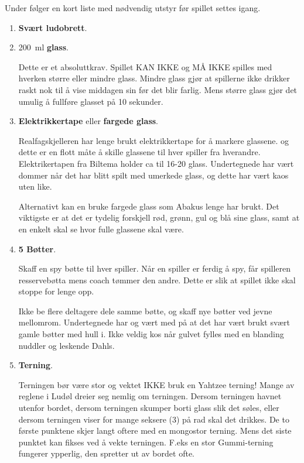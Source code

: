 \documentclass[10pt,a4paper,norsk,openany]{book}
\begin{document}
Under følger en kort liste med nødvendig utstyr før spillet settes igang.

\begin{enumerate}

  \item \textbf{Svært ludobrett}.

  \item \SI{200}{\ml} \textbf{glass}.

    Dette er et absoluttkrav. Spillet KAN IKKE og MÅ IKKE spilles med hverken
    større eller mindre glass. Mindre glass gjør at spillerne ikke drikker raskt
    nok til å vise middagen sin før det blir farlig. Mens større glass gjør det
    umulig å fullføre glasset på 10 sekunder.

  \item \textbf{Elektrikkertape} eller \textbf{fargede glass}.

    Realfagskjelleren har lenge brukt elektrikkertape for å markere glassene.
    og dette er en flott måte å skille glassene til hver spiller fra hverandre.
    Elektrikertapen fra Biltema holder ca til 16-20 glass. 
    Undertegnede har vært dommer når det har blitt spilt med umerkede glass, og
    dette har vært kaos uten like.

    Alternativt kan en bruke fargede glass som Abakus lenge har brukt. Det
    viktigste er at det er tydelig forskjell rød, grønn, gul og blå sine glass,
    samt at en enkelt skal se hvor fulle glassene skal være.

  \item \textbf{5 Bøtter}.

    Skaff en spy bøtte til hver spiller. Når en spiller er ferdig å spy, får
    spilleren resservebøtta mens coach tømmer den andre. Dette er slik at
    spillet ikke skal stoppe for lenge opp.

    Ikke be flere deltagere dele samme bøtte, og skaff nye bøtter ved jevne
    mellomrom. Undertegnede har og vært med på at det har vært brukt svært gamle
    bøtter med hull i. Ikke veldig kos når gulvet fylles
    med en blanding nuddler og leskende Dahls.

  \item \textbf{Terning}.

    Terningen bør være stor og vektet IKKE bruk en Yahtzee terning! Mange av
    reglene i Ludøl dreier seg nemlig om terningen. Dersom terningen havnet
    utenfor bordet, dersom terningen skumper borti glass slik det søles, eller
    dersom terningen viser for mange seksere (3) på rad skal det drikkes. De to
    første punktene skjer langt oftere med en mongostor terning. Mens det siste
    punktet kan fikses ved å vekte terningen. F.eks en stor Gummi-terning
    fungerer ypperlig, den spretter ut av bordet ofte.


\end{enumerate}
\end{document}
